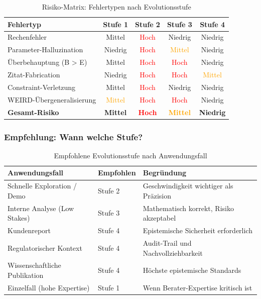 \begin{table}[h]
\centering
\caption{Risiko-Matrix: Fehlertypen nach Evolutionsstufe}
\small
\begin{tabular}{@{}lcccc@{}}
\toprule
\textbf{Fehlertyp} & \textbf{Stufe 1} & \textbf{Stufe 2} & \textbf{Stufe 3} & \textbf{Stufe 4} \\
\midrule
Rechenfehler & Mittel & \textcolor{red}{Hoch} & Niedrig & Niedrig \\
Parameter-Halluzination & Niedrig & \textcolor{red}{Hoch} & \textcolor{orange}{Mittel} & Niedrig \\
Überbehauptung (B > E) & Mittel & \textcolor{red}{Hoch} & \textcolor{red}{Hoch} & Niedrig \\
Zitat-Fabrication & Niedrig & \textcolor{red}{Hoch} & \textcolor{red}{Hoch} & \textcolor{orange}{Mittel} \\
Constraint-Verletzung & Mittel & \textcolor{red}{Hoch} & Niedrig & Niedrig \\
WEIRD-Übergeneralisierung & \textcolor{orange}{Mittel} & \textcolor{red}{Hoch} & \textcolor{red}{Hoch} & Niedrig \\
\midrule
\textbf{Gesamt-Risiko} & \textbf{Mittel} & \textbf{\textcolor{red}{Hoch}} & \textbf{\textcolor{orange}{Mittel}} & \textbf{Niedrig} \\
\bottomrule
\end{tabular}
\end{table}

\subsubsection{Empfehlung: Wann welche Stufe?}

\begin{table}[h]
\centering
\caption{Empfohlene Evolutionsstufe nach Anwendungsfall}
\small
\begin{tabular}{@{}lll@{}}
\toprule
\textbf{Anwendungsfall} & \textbf{Empfohlen} & \textbf{Begründung} \\
\midrule
Schnelle Exploration / Demo & Stufe 2 & Geschwindigkeit wichtiger als Präzision \\
Interne Analyse (Low Stakes) & Stufe 3 & Mathematisch korrekt, Risiko akzeptabel \\
Kundenreport & Stufe 4 & Epistemische Sicherheit erforderlich \\
Regulatorischer Kontext & Stufe 4 & Audit-Trail und Nachvollziehbarkeit \\
Wissenschaftliche Publikation & Stufe 4 & Höchste epistemische Standards \\
Einzelfall (hohe Expertise) & Stufe 1 & Wenn Berater-Expertise kritisch ist \\
\bottomrule
\end{tabular}
\end{table}


